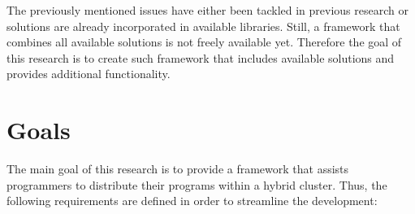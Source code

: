 The previously mentioned issues have either been tackled in previous research or solutions are already incorporated in available libraries. Still, a framework that combines all available solutions is not freely available yet. Therefore the goal of this research is to create such framework that includes available solutions and provides additional functionality.

\section{Goals}

The main goal of this research is to provide a framework that assists programmers to distribute their programs within a hybrid cluster. Thus, the following requirements are defined in order to streamline the development:

